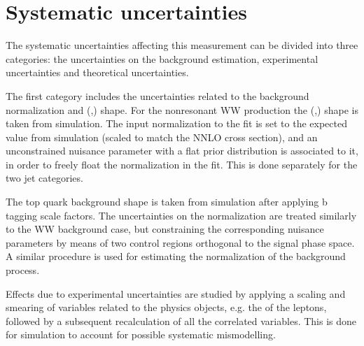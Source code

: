 \section{Systematic uncertainties}\label{chap5:systs}

The systematic uncertainties affecting this measurement can be divided into three categories: the uncertainties on the background estimation, experimental uncertainties and theoretical uncertainties.

The first category includes the uncertainties related to the background normalization and (\mll,\mt) shape. For the nonresonant WW production the (\mll,\mt) shape is taken from simulation. The input normalization to the fit is set to the expected value from simulation (scaled to match the NNLO cross section), and an unconstrained nuisance parameter with a flat prior distribution is associated to it, in order to freely float the normalization in the fit. This is done separately for the two jet categories.

The top quark background shape is taken from simulation after applying b tagging scale factors. The uncertainties on the normalization are treated similarly to the WW background case, but constraining the corresponding nuisance parameters by means of two control regions orthogonal to the signal phase space. A similar procedure is used for estimating the normalization of the \dytt background process.

Effects due to experimental uncertainties are studied by applying a scaling and smearing of variables related to the physics objects, e.g. the \pt of the leptons, followed by a subsequent recalculation of all the correlated variables. This is done for simulation to account for possible systematic mismodelling.


